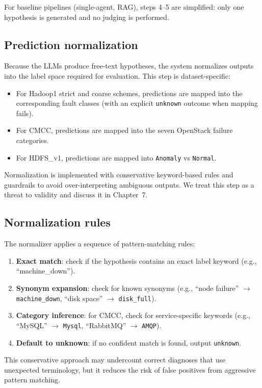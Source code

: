 For baseline pipelines (single-agent, RAG), steps 4--5 are simplified: only one hypothesis is
generated and no judging is performed.

\subsection{Prediction normalization}
Because the LLMs produce free-text hypotheses, the system normalizes outputs into the label space
required for evaluation. This step is dataset-specific:
\begin{itemize}
  \item For Hadoop1 strict and coarse schemes, predictions are mapped into the corresponding fault
        classes (with an explicit \texttt{unknown} outcome when mapping fails).
  \item For CMCC, predictions are mapped into the seven OpenStack failure categories.
  \item For HDFS\_v1, predictions are mapped into \texttt{Anomaly} vs \texttt{Normal}.
\end{itemize}
Normalization is implemented with conservative keyword-based rules and guardrails to avoid
over-interpreting ambiguous outputs. We treat this step as a threat to validity and discuss it in
Chapter~7.

\subsection{Normalization rules}
The normalizer applies a sequence of pattern-matching rules:
\begin{enumerate}
  \item \textbf{Exact match}: check if the hypothesis contains an exact label keyword (e.g.,
        ``machine\_down'').
  \item \textbf{Synonym expansion}: check for known synonyms (e.g., ``node failure''
        $\rightarrow$ \texttt{machine\_down}, ``disk space'' $\rightarrow$ \texttt{disk\_full}).
  \item \textbf{Category inference}: for CMCC, check for service-specific keywords (e.g.,
        ``MySQL'' $\rightarrow$ \texttt{Mysql}, ``RabbitMQ'' $\rightarrow$ \texttt{AMQP}).
  \item \textbf{Default to unknown}: if no confident match is found, output \texttt{unknown}.
\end{enumerate}

This conservative approach may undercount correct diagnoses that use unexpected terminology, but
it reduces the risk of false positives from aggressive pattern matching.

